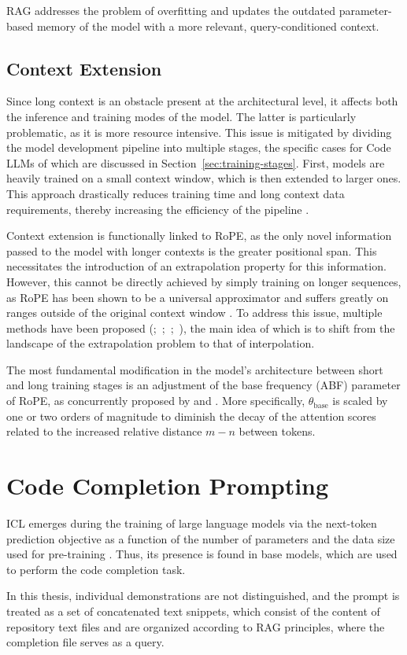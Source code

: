 \begin{sloppypar}
RAG addresses the problem of overfitting and updates the outdated parameter-based memory of the model with a more relevant, query-conditioned context.
\end{sloppypar}

\subsection{Context Extension}

Since long context is an obstacle present at the architectural level, it affects both the inference and training modes of the model. The latter is particularly problematic, as it is more resource intensive. This issue is mitigated by dividing the model development pipeline into multiple stages, the specific cases for Code LLMs of which are discussed in Section~\ref{sec:training-stages}. First, models are heavily trained on a small context window, which is then extended to larger ones. This approach drastically reduces training time and long context data requirements, thereby increasing the efficiency of the pipeline \parencite{xiong2023}.

Context extension is functionally linked to RoPE, as the only novel information passed to the model with longer contexts is the greater positional span. This necessitates the introduction of an extrapolation property for this information. However, this cannot be directly achieved by simply training on longer sequences, as RoPE has been shown to be a universal approximator and suffers greatly on ranges outside of the original context window \parencite{chen2023}. To address this issue, multiple methods have been proposed (\cite{chen2023};~\cite{rozière2023};~\cite{peng2023};~\cite{xiong2023}), the main idea of which is to shift from the landscape of the extrapolation problem to that of interpolation.

The most fundamental modification in the model's architecture between short and long training stages is an adjustment of the base frequency (ABF) parameter of RoPE, as concurrently proposed by \citet{rozière2023} and \citet{xiong2023}. More specifically, \(\theta_{\mathrm{base}}\) is scaled by one or two orders of magnitude to diminish the decay of the attention scores related to the increased relative distance \(m - n\) between tokens.

\section{Code Completion Prompting}

ICL emerges during the training of large language models via the next-token prediction objective as a function of the number of parameters and the data size used for pre-training \parencite{hahn2023}. Thus, its presence is found in base models, which are used to perform the code completion task.

In this thesis, individual demonstrations are not distinguished, and the prompt is treated as a set of concatenated text snippets, which consist of the content of repository text files and are organized according to RAG principles, where the completion file serves as a query.
